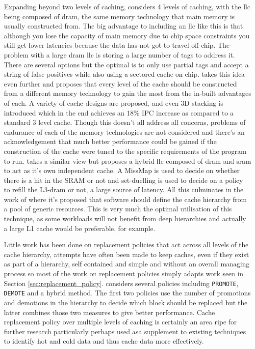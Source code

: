 Expanding beyond two levels of caching, \citet{zhaoExploringDRAMCache2007} considers 4 levels of caching, with the \gls{llc} being composed of \gls{dram}, the same memory technology that main memory is usually constructed from. The big advantage to including an \gls{llc} like this is that although you lose the capacity of main memory due to chip space constraints you still get lower latencies because the data has not got to travel off-chip. The problem with a large \gls{dram} \gls{llc} is storing a large number of tags to address it. There are several options but the optimal is to only use partial tags and accept a string of false positives while also using a sectored cache on chip. \citet{wuHybridCacheArchitecture2009} takes this idea even further and proposes that every level of the cache should be constructed from a different memory technology to gain the most from the in-built advantages of each. A variety of cache designs are proposed, and even 3D stacking is introduced which in the end achieves an 18\% IPC increase as compared to a standard 3 level cache. Though this doesn't all address all concerns, problems of endurance of each of the memory technologies are not considered and there's an acknowledgement that much better performance could be gained if the construction of the cache were tuned to the specific requirements of the program to run. \citet{hameedAdaptiveCacheManagement2013a, hameedReducingLatencySRAM2014} takes a similar view but proposes a hybrid \gls{llc} composed of \gls{dram} and \gls{sram} to act as it's own independent cache. A MissMap \cite{lohEfficientlyEnablingConventional2011} is used to decide on whether there is a hit in the SRAM or not and set-duelling is used to decide on a policy to refill the L3-\gls{dram} or not, a large source of latency. All this culminates in the work of \citet{tsaiJengaSoftwaredefinedCache2017} where it's proposed that software should define the cache hierarchy from a pool of generic resources. This is very much the optimal utilisation of this technique, as some workloads will not benefit from deep hierarchies and actually a large L1 cache would be preferable, for example. 

Little work has been done on replacement policies that act across all levels of the cache hierarchy, attempts have often been made to keep caches, even if they exist as part of a hierarchy, self contained and simple and without an overall managing process so most of the work on replacement policies simply adapts work seen in Section \ref{sec:replacement_policy}. \citet{kelwadeReputationBasedCache2017} considers several policies including \texttt{PROMOTE}, \texttt{DEMOTE} and a hybrid method. The first two policies use the number of promotions and demotions in the hierarchy to decide which block should be replaced but the latter combines those two measures to give better performance. Cache replacement policy over multiple levels of caching is certainly an area ripe for further research particularly perhaps used asa supplement to existing techniques to identify hot and cold data and thus cache data more effectively.

